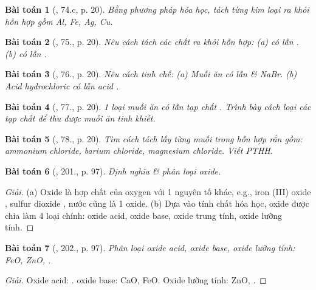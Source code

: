 \documentclass{article}
\newtheorem{baitoan}{Bài toán}
\begin{document}
\begin{baitoan}[\cite{An_400_BT_Hoa_Hoc_9}, 74.c, p. 20]
	Bằng phương pháp hóa học, tách từng kim loại ra khỏi hỗn hợp gồm {\rm Al, Fe, Ag, Cu}.
\end{baitoan}

\begin{baitoan}[\cite{An_400_BT_Hoa_Hoc_9}, 75., p. 20]
	Nêu cách tách các chất ra khỏi hỗn hợp: (a) {\rm{} có lẫn }. (b) {\rm{} có lẫn }.
\end{baitoan}

\begin{baitoan}[\cite{An_400_BT_Hoa_Hoc_9}, 76., p. 20]
	Nêu cách tinh chế: (a) Muối ăn có lẫn {\rm{}} \& {\rm NaBr}. (b) Acid hydrochloric có lẫn acid {\rm{}}.
\end{baitoan}

\begin{baitoan}[\cite{An_400_BT_Hoa_Hoc_9}, 77., p. 20]
	1 loại muối ăn có lẫn tạp chất {\rm{}}. Trình bày cách loại các tạp chất để thu được muối ăn tinh khiết.
\end{baitoan}

\begin{baitoan}[\cite{An_400_BT_Hoa_Hoc_9}, 78., p. 20]
	Tìm cách tách lấy từng muối trong hỗn hợp rắn gồm: ammonium chloride, barium chloride, magnesium chloride. Viết {\rm PTHH}.
\end{baitoan}

\begin{baitoan}[\cite{Nguyen_Buu_Can_500_BT_Hoa_Hoc_THCS}, 201., p. 97]
	Định nghĩa \& phân loại oxide.
\end{baitoan}

\begin{proof}[Giải]
	(a) Oxide là hợp chất của oxygen với 1 nguyên tố khác, e.g., iron (III) oxide , sulfur dioxide , nước  cũng là 1 oxide. (b) Dựa vào tính chất hóa học, oxide được chia làm 4 loại chính: oxide acid, oxide base, oxide trung tính, oxide lưỡng tính.
\end{proof}

\begin{baitoan}[\cite{Nguyen_Buu_Can_500_BT_Hoa_Hoc_THCS}, 202., p. 97]
	Phân loại oxide acid, oxide base, oxide lưỡng tính: {\rm FeO, ZnO, }.
\end{baitoan}

\begin{proof}[Giải]
	Oxide acid: . oxide base: CaO, FeO. Oxide lưỡng tính: ZnO, .
\end{proof}
\end{document}
